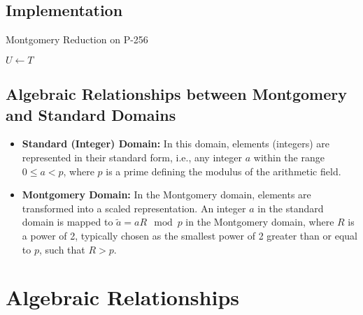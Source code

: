 \newpage
\subsection{Implementation}
\begin{algorithm}[H]
	\DontPrintSemicolon
	\caption{Montgomery Reduction on P-256}
	\BlankLine
	\BlankLine
	\BlankLine
	$U\gets T$
\end{algorithm}

\newpage
\subsection{Algebraic Relationships between Montgomery and Standard Domains}

\begin{itemize}
\item \textbf{Standard (Integer) Domain:} In this domain, elements (integers) are represented in their standard form, i.e., any integer $a$ within the range $0 \leq a < p$, where $p$ is a prime defining the modulus of the arithmetic field.
\item \textbf{Montgomery Domain:} In the Montgomery domain, elements are transformed into a scaled representation. An integer $a$ in the standard domain is mapped to $\widetilde{a} = aR \mod p$ in the Montgomery domain, where $R$ is a power of 2, typically chosen as the smallest power of 2 greater than or equal to $p$, such that $R > p$.
\end{itemize}

\section*{Algebraic Relationships}

